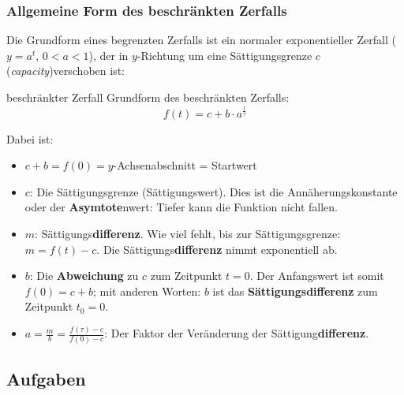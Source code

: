 \newpage

\subsubsection{Allgemeine Form des beschränkten Zerfalls}
\begin{center}
\end{center}

Die Grundform eines begrenzten Zerfalls ist ein normaler
exponentieller Zerfall ($y=a^{t}$, $0<a<1$), der in $y$-Richtung um
eine Sättigungsgrenze $c$
(\textit{capacity})verschoben ist:

\begin{gesetz}{beschränkter Zerfall}{}
  Grundform des beschränkten Zerfalls:
$$f(t) = c + b\cdot{}a^{\frac{t}{\tau}}$$
\end{gesetz}

Dabei ist:
\begin{itemize}
  \item $c+b = f(0) = y$-Achsenabschnitt = Startwert
	\item $c$: Die Sättigungsgrenze (Sättigungswert). Dies ist die Annäherungskonstante oder der \textbf{Asymtote}nwert: Tiefer kann die Funktion nicht fallen.

	\item $m$:
    Sättigungs\textbf{differenz}. Wie viel fehlt, bis zur
    Sättigungsgrenze: $m = f(t) - c$. Die Sättigungs\textbf{differenz} nimmt exponentiell ab.
	\item $b$: Die \textbf{Abweichung} zu $c$ zum Zeitpunkt $t=0$. Der
    Anfangswert ist somit $f(0) = c + b$; mit anderen Worten: $b$ ist das
    \textbf{Sättigungsdifferenz} zum Zeitpunkt $t_0 = 0$.

    \item $a=\frac{m}{b}=\frac{f(\tau)-c}{f(0)-c}$: Der Faktor der Veränderung der
      Sättigung\textbf{differenz}.
\end{itemize}
\newpage


\subsection*{Aufgaben}

